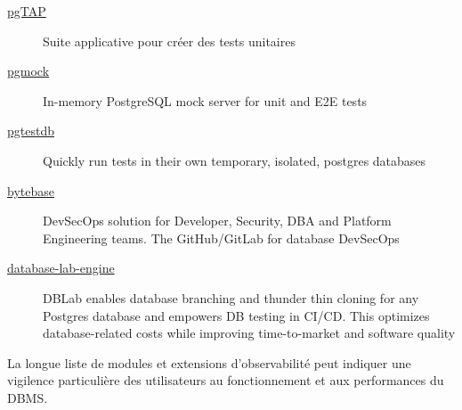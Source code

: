 \documentclass[a4paper,12pt]{article}
\begin{document}
\begin{multicols*}{2}
\begin{description}
\item[{\href{https://github.com/theory/pgtap}{pgTAP}}] Suite applicative pour créer des tests unitaires
\item[{\href{https://github.com/stack-auth/pgmock}{pgmock}}] In-memory PostgreSQL mock server for unit and E2E tests
\item[{\href{https://github.com/peterldowns/pgtestdb}{pgtestdb}}] Quickly run tests in their own temporary, isolated, postgres databases
\item[{\href{https://github.com/bytebase/bytebase}{bytebase}}] DevSecOps solution for Developer, Security, DBA and Platform Engineering teams. The GitHub/GitLab for database DevSecOps
\item[{\href{https://github.com/postgres-ai/database-lab-engine}{database-lab-engine}}] DBLab enables database branching and thunder thin cloning for any Postgres database and empowers DB testing in CI/CD. This optimizes database-related costs while improving time-to-market and software quality
\end{description}

La longue liste de modules et extensions d'observabilité peut indiquer une vigilence particulière des utilisateurs au fonctionnement et aux performances du DBMS.


\end{multicols*}
\end{document}
